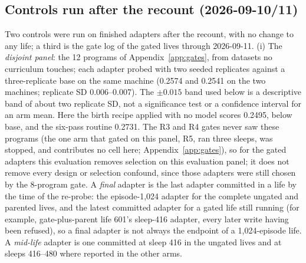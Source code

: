 \documentclass{article}
\begin{document}
\subsection{Controls run after the recount (2026-09-10/11)}
\label{sec:controls}

Two controls were run on finished adapters after the recount, with no change to any life; a third is the gate log of the gated lives through 2026-09-11. (i) The \emph{disjoint panel}: the 12 programs of Appendix~\ref{app:gates}, from datasets no curriculum touches; each adapter probed with two seeded replicates against a three-replicate base on the same machine (0.2574 and 0.2541 on the two machines; replicate SD 0.006--0.007). The $\pm 0.015$ band used below is a descriptive band of about two replicate SD, not a significance test or a confidence interval for an arm mean. Here the birth recipe applied with no model scores 0.2495, below base, and the six-pass routine 0.2731. The R3 and R4 gates never saw these programs (the one arm that gated on this panel, R5, ran three sleeps, was stopped, and contributes no cell here; Appendix~\ref{app:gates}), so for the gated adapters this evaluation removes selection on this evaluation panel; it does not remove every design or selection confound, since those adapters were still chosen by the 8-program gate.
A \emph{final} adapter is the last adapter committed in a life by the time of the re-probe: the episode-1{,}024 adapter for the complete ungated and parented lives, and the latest committed adapter for a gated life still running (for example, gate-plus-parent life 601's sleep-416 adapter, every later write having been refused), so a final adapter is not always the endpoint of a 1{,}024-episode life. A \emph{mid-life} adapter is one committed at sleep 416 in the ungated lives and at sleeps 416--480 where reported in the other arms.
\end{document}
